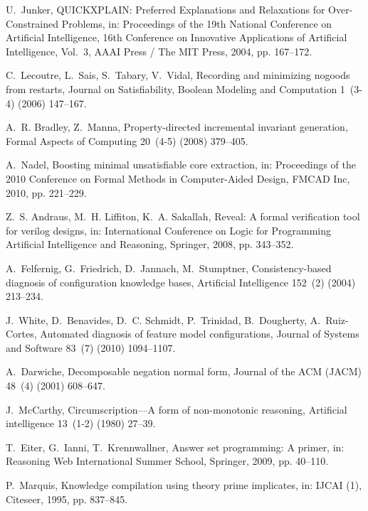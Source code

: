 \documentclass[]{elsarticle}
\begin{document}
\begin{thebibliography}{10}
		U.~Junker, {QUICKXPLAIN: Preferred Explanations and Relaxations for
			Over-Constrained Problems}, in: Proceedings of the 19th National Conference on Artificial Intelligence,
		16th Conference on Innovative Applications of Artificial Intelligence,
		Vol.~3, AAAI Press / The MIT Press, 2004, pp. 167--172.
		
		C.~Lecoutre, L.~Sais, S.~Tabary, V.~Vidal, Recording and minimizing nogoods
		from restarts, Journal on Satisfiability, Boolean Modeling and Computation
		1~(3-4) (2006) 147--167.
		
		A.~R. Bradley, Z.~Manna, Property-directed incremental invariant generation,
		Formal Aspects of Computing 20~(4-5) (2008) 379--405.
		
		A.~Nadel, Boosting minimal unsatisfiable core extraction, in: Proceedings of
		the 2010 Conference on Formal Methods in Computer-Aided Design, FMCAD Inc,
		2010, pp. 221--229.
		
		Z.~S. Andraus, M.~H. Liffiton, K.~A. Sakallah, Reveal: A formal verification
		tool for verilog designs, in: International Conference on Logic for
		Programming Artificial Intelligence and Reasoning, Springer, 2008, pp.
		343--352.
		
		A.~Felfernig, G.~Friedrich, D.~Jannach, M.~Stumptner, {Consistency-based
			diagnosis of configuration knowledge bases}, Artificial Intelligence 152~(2)
		(2004) 213--234.
		
		J.~White, D.~Benavides, D.~C. Schmidt, P.~Trinidad, B.~Dougherty,
		A.~Ruiz-Cortes, Automated diagnosis of feature model configurations, Journal
		of Systems and Software 83~(7) (2010) 1094--1107.
		
		A.~Darwiche, Decomposable negation normal form, Journal of the ACM (JACM)
		48~(4) (2001) 608--647.
		
		J.~McCarthy, Circumscription---A form of non-monotonic reasoning, Artificial
		intelligence 13~(1-2) (1980) 27--39.
		
		T.~Eiter, G.~Ianni, T.~Krennwallner, Answer set programming: A primer, in:
		Reasoning Web International Summer School, Springer, 2009, pp. 40--110.
		
		P.~Marquis, Knowledge compilation using theory prime implicates, in: IJCAI (1),
		Citeseer, 1995, pp. 837--845.
		

\end{thebibliography}
\end{document}
